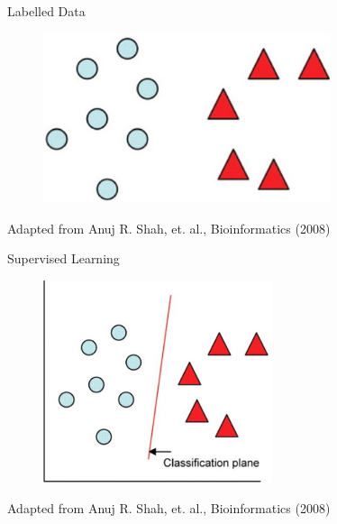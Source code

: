 \documentclass[utf8, a4paper]{beamer}
\begin{document}
\begin{frame} {Labelled Data} 

\vspace{-0.9cm}

\begin{figure}
\centering
  \includegraphics[trim={0cm 0cm 0cm 0cm},clip, width=0.75\textwidth]{images/topleft}
\end{figure}
\tiny{Adapted from Anuj R. Shah, et. al.,  Bioinformatics (2008) }

\end{frame}
\begin{frame} {Supervised Learning} 

\vspace{-0.9cm}

\begin{figure}
\centering
  \includegraphics[trim={0cm 0cm 0cm 0cm},clip, width=0.6\textwidth]{images/bottomleft}
\end{figure}

\vspace{0cm}

\tiny{Adapted from Anuj R. Shah, et. al.,  Bioinformatics (2008) }

\end{frame}
\end{document}
